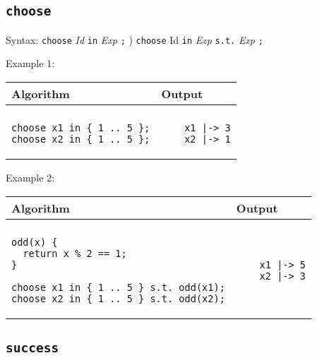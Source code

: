 \documentclass[a4paper]{report}
\begin{document}
\subsection{\texttt{choose}}

Syntax:  \verb"choose" {\it Id} \verb"in" {\it Exp} \verb";"  ) \verb"choose" Id \verb"in" {\it Exp} \verb"s.t." {\it Exp} \verb";"    

Example 1:
\begin{center}
\begin{tabular}{ll}
Algorithm & Output\\
\hline
\\
\begin{minipage}{.45\textwidth}
\begin{verbatim}
choose x1 in { 1 .. 5 };
choose x2 in { 1 .. 5 };
\end{verbatim}
\end{minipage}
&
\begin{minipage}{.45\textwidth}
\begin{verbatim}
    x1 |-> 3
    x2 |-> 1
\end{verbatim}
\end{minipage}
\end{tabular}
\end{center}

Example 2:
\begin{center}
\begin{tabular}{ll}
Algorithm & Output\\
\hline
\\
\begin{minipage}{.45\textwidth}
\begin{verbatim}
odd(x) {
  return x % 2 == 1;
}

choose x1 in { 1 .. 5 } s.t. odd(x1);
choose x2 in { 1 .. 5 } s.t. odd(x2);
\end{verbatim}
\end{minipage}
&
\begin{minipage}{.45\textwidth}
\begin{verbatim}
    x1 |-> 5
    x2 |-> 3
\end{verbatim}
\end{minipage}
\end{tabular}
\end{center}


\subsection{\texttt{success}}
\end{document}
